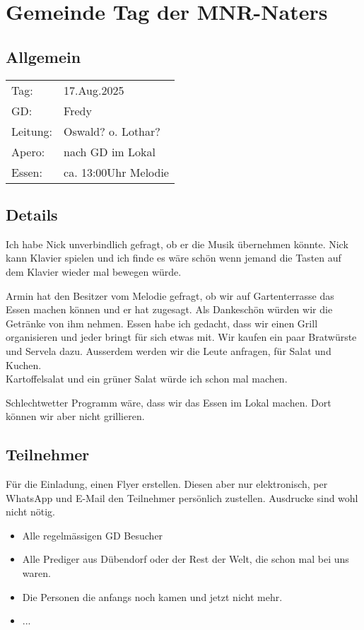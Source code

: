 \documentclass{../inc/mybib}
\begin{document}
    \section*{Gemeinde Tag der MNR-Naters}
    \subsection*{Allgemein}
    
    \begin{tabular}{ l l }
         Tag: & 17.Aug.2025 \\ 
         GD: & Fredy \\  
         Leitung: & Oswald? o. Lothar? \\   
         Apero: & nach GD im Lokal \\
         Essen: & ca. 13:00Uhr Melodie
    \end{tabular}
    \subsection*{Details}
    Ich habe Nick unverbindlich gefragt, ob er die Musik übernehmen könnte. Nick kann Klavier spielen und ich finde es wäre schön wenn jemand die Tasten auf dem Klavier wieder mal bewegen würde.

    Armin hat den Besitzer vom Melodie gefragt, ob wir auf Gartenterrasse das Essen machen können und er hat zugesagt. Als Dankeschön würden wir die Getränke von ihm nehmen.
    Essen habe ich gedacht, dass wir einen Grill organisieren und jeder bringt für sich etwas mit. Wir kaufen ein paar Bratwürste und Servela dazu. Ausserdem werden wir die Leute anfragen, für Salat und Kuchen.\\
    Kartoffelsalat und ein grüner Salat würde ich schon mal machen.

    Schlechtwetter Programm wäre, dass wir das Essen im Lokal machen. Dort können wir aber nicht grillieren. 

    \subsection*{Teilnehmer}
    Für die Einladung, einen Flyer erstellen. Diesen aber nur elektronisch, per WhatsApp und E-Mail den Teilnehmer persönlich zustellen. Ausdrucke sind wohl nicht nötig.
    \begin{itemize}
        \item Alle regelmässigen GD Besucher
        \item Alle Prediger aus Dübendorf oder der Rest der Welt, die schon mal bei uns waren.
        \item Die Personen die anfangs noch kamen und jetzt nicht mehr.
        \item ...
    \end{itemize}      
    
\end{document}
